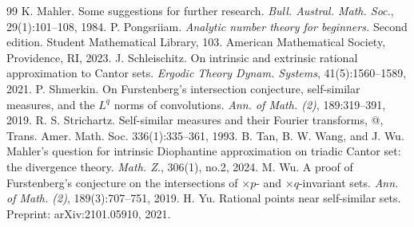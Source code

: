 \documentclass[10pt,a4paper]{amsart}
\makeatletter
\numberwithin{equation}{section} %
\newcommand{\Rmnum}[1]{\expandafter\@slowromancap\romannumeral #1@}
\makeatother
\begin{document}
\begin{thebibliography}{99}
 K. Mahler. Some suggestions for further research. {\em Bull. Austral. Math. Soc.}, 29(1):101--108, 1984.
 P. Pongsriiam. {\em Analytic number theory for beginners.} Second edition. Student Mathematical Library, 103. American Mathematical Society, Providence, RI, 2023.
 J. Schleischitz. On intrinsic and extrinsic rational approximation to Cantor sets. {\em Ergodic Theory Dynam. Systems}, 41(5):1560--1589, 2021.
 P. Shmerkin. On Furstenberg's intersection conjecture, self-similar measures, and the $L^q$ norms of convolutions. {\em Ann. of Math. (2)}, 189:319--391, 2019.
 R. S. Strichartz. Self-similar measures and their Fourier transforms, \Rmnum{2}, Trans. Amer. Math. Soc. 336(1):335–361, 1993.
 B. Tan, B. W. Wang, and J. Wu. Mahler's question for intrinsic Diophantine approximation on triadic Cantor set: the divergence theory. {\em Math. Z.}, 306(1), no.2, 2024.
 M. Wu. A proof of Furstenberg's conjecture on the intersections of $\times p$- and $\times q$-invariant sets. {\em Ann. of Math. (2)}, 189(3):707--751, 2019.
 H. Yu. Rational points near self-similar sets. Preprint: arXiv:2101.05910, 2021.
\end{thebibliography}
\end{document}
